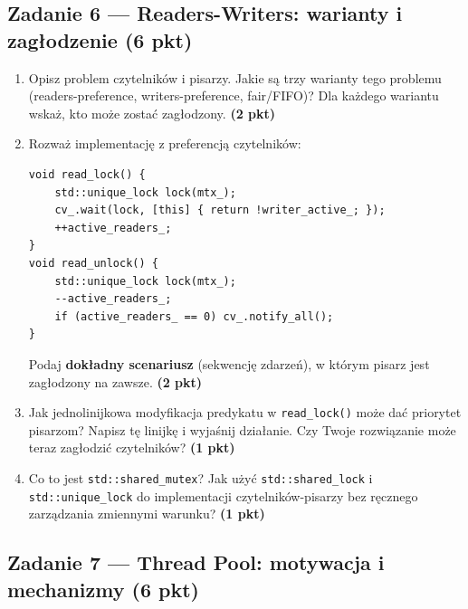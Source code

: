 \documentclass[11pt,a4paper]{article}
\newcommand{\pkt}[1]{\hfill\textbf{(#1 pkt)}}
\begin{document}
\subsection*{Zadanie 6 --- Readers-Writers: warianty i zagłodzenie \pkt{6}}

\begin{enumerate}[label=(\alph*)]
\item Opisz problem czytelników i pisarzy. Jakie są trzy warianty tego problemu (readers-preference, writers-preference, fair/FIFO)? Dla każdego wariantu wskaż, kto może zostać zagłodzony. \pkt{2}

\item Rozważ implementację z preferencją czytelników:
\begin{lstlisting}
void read_lock() {
    std::unique_lock lock(mtx_);
    cv_.wait(lock, [this] { return !writer_active_; });
    ++active_readers_;
}
void read_unlock() {
    std::unique_lock lock(mtx_);
    --active_readers_;
    if (active_readers_ == 0) cv_.notify_all();
}
\end{lstlisting}
Podaj \textbf{dokładny scenariusz} (sekwencję zdarzeń), w którym pisarz jest zagłodzony na zawsze. \pkt{2}

\item Jak jednolinijkowa modyfikacja predykatu w \texttt{read\_lock()} może dać priorytet pisarzom? Napisz tę linijkę i wyjaśnij działanie. Czy Twoje rozwiązanie może teraz zagłodzić czytelników? \pkt{1}

\item Co to jest \texttt{std::shared\_mutex}? Jak użyć \texttt{std::shared\_lock} i \texttt{std::unique\_lock} do implementacji czytelników-pisarzy bez ręcznego zarządzania zmiennymi warunku? \pkt{1}
\end{enumerate}

\subsection*{Zadanie 7 --- Thread Pool: motywacja i mechanizmy \pkt{6}}
\end{document}

